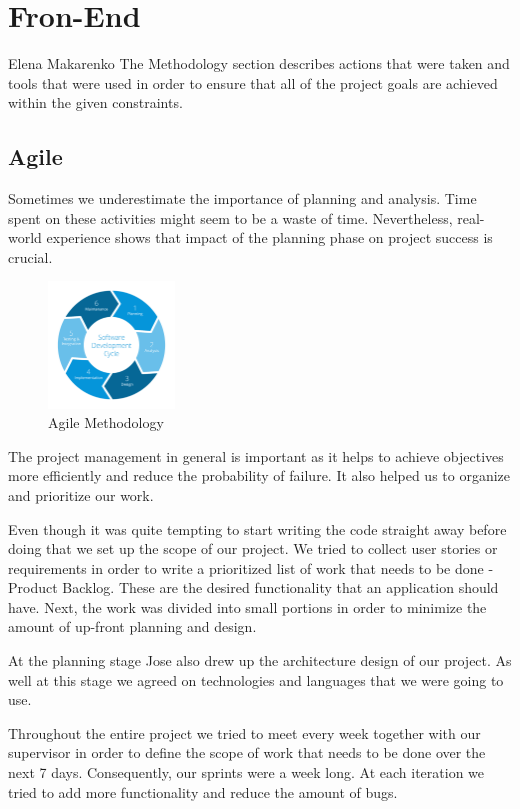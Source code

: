 \section{Fron-End}
Elena Makarenko
\vskip 0.1in
\indent
\indent
The Methodology section describes actions that were taken and tools that were used in order to ensure that all of the project goals are achieved within the given constraints.

\subsection{Agile} 
\indent
\indent
Sometimes we underestimate the importance of planning and analysis.
Time spent on these activities might seem to be a waste of time.
Nevertheless, real-world experience shows that impact of the planning phase on project success is crucial.

\begin{figure}[ht]
    \centering
    \includegraphics[width=0.3\textwidth]{img/agile.png}
     \caption{Agile Methodology}
    \label{fig:Agile}
\end{figure}

The project management in general is important as it helps to achieve objectives more efficiently and reduce the probability of failure.  It also helped us to organize and prioritize our work.

Even though it was quite tempting to start writing the code straight away before doing that we set up the scope of our project.
We tried to collect user stories or requirements in order to write a prioritized list of work that needs to be done -  Product Backlog. These are the desired functionality that an application should have. Next, the work was divided into small portions in order to minimize the amount of up-front planning and design. 

At the planning stage Jose also drew up the architecture design of our project.
As well at this stage we agreed on technologies and languages that we were going to use. 

Throughout the entire project we tried to meet every week together with our supervisor in order to define the scope of work that needs to be done over the next 7 days. Consequently, our sprints were a week long. At each iteration we tried to add more functionality and reduce the amount of bugs.
 
